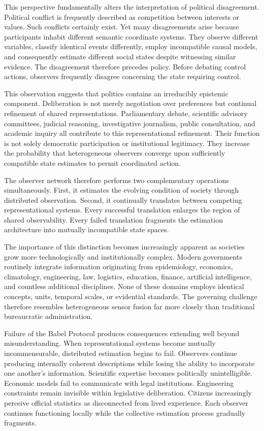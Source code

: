 \documentclass[12pt,a4paper]{article}
\begin{document}
This perspective fundamentally alters the interpretation of political disagreement. Political conflict is frequently described as competition between interests or values. Such conflicts certainly exist. Yet many disagreements arise because participants inhabit different semantic coordinate systems. They observe different variables, classify identical events differently, employ incompatible causal models, and consequently estimate different social states despite witnessing similar evidence. The disagreement therefore precedes policy. Before debating control actions, observers frequently disagree concerning the state requiring control.

This observation suggests that politics contains an irreducibly epistemic component. Deliberation is not merely negotiation over preferences but continual refinement of shared representations. Parliamentary debate, scientific advisory committees, judicial reasoning, investigative journalism, public consultation, and academic inquiry all contribute to this representational refinement. Their function is not solely democratic participation or institutional legitimacy. They increase the probability that heterogeneous observers converge upon sufficiently compatible state estimates to permit coordinated action.

The observer network therefore performs two complementary operations simultaneously. First, it estimates the evolving condition of society through distributed observation. Second, it continually translates between competing representational systems. Every successful translation enlarges the region of shared observability. Every failed translation fragments the estimation architecture into mutually incompatible state spaces.

The importance of this distinction becomes increasingly apparent as societies grow more technologically and institutionally complex. Modern governments routinely integrate information originating from epidemiology, economics, climatology, engineering, law, logistics, education, finance, artificial intelligence, and countless additional disciplines. None of these domains employs identical concepts, units, temporal scales, or evidential standards. The governing challenge therefore resembles heterogeneous sensor fusion far more closely than traditional bureaucratic administration.

Failure of the Babel Protocol produces consequences extending well beyond misunderstanding. When representational systems become mutually incommensurable, distributed estimation begins to fail. Observers continue producing internally coherent descriptions while losing the ability to incorporate one another's information. Scientific expertise becomes politically unintelligible. Economic models fail to communicate with legal institutions. Engineering constraints remain invisible within legislative deliberation. Citizens increasingly perceive official statistics as disconnected from lived experience. Each observer continues functioning locally while the collective estimation process gradually fragments.
\end{document}

